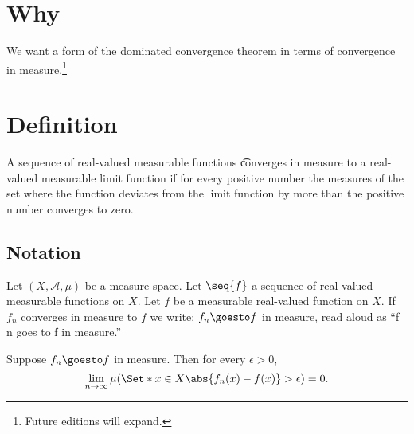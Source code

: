
\section*{Why}

We want a form of the dominated convergence theorem in terms of convergence in measure.\footnote{Future editions will expand.}

\section*{Definition}

A sequence of real-valued measurable functions \t{converges in measure} to a real-valued measurable limit function if for every positive number the measures of the set where the function deviates from the limit function by more than the positive number converges to zero.

\subsection*{Notation}

Let $(X, \mathcal{A} , \mu )$ be a measure space.
Let $\seq{f}$ a sequence of real-valued measurable functions on $X$.
Let $f$ be a measurable real-valued function on $X$.
If $f_n$ converges in measure to $f$ we write: $f_n \goesto f$ in measure, read aloud as ``f n goes to f in measure.''

Suppose $f_n \goesto f$ in measure.
Then for every $\epsilon  > 0$,
\[
\lim_{n \to \infty} \mu (\Set*{x \in X}{\abs{f_n(x) - f(x)} > \epsilon }) = 0.
\]

\blankpage